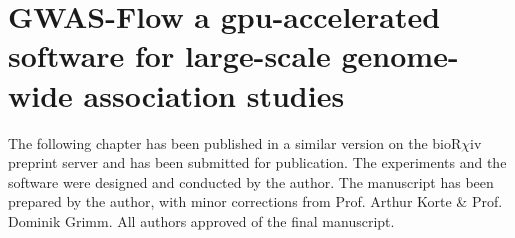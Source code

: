 
\chapter{GWAS-Flow a gpu-accelerated software for large-scale genome-wide association studies}

\label{Chapter3} %


The following chapter has been published in a similar version on the bioR$\chi$iv preprint
server \cite{Freudenthal_2019} and has been submitted for publication. The experiments and
the software were designed and conducted by the author. The manuscript has been prepared
by the author, with minor corrections from Prof. Arthur Korte \& Prof. Dominik Grimm. All
authors approved of the final manuscript.


